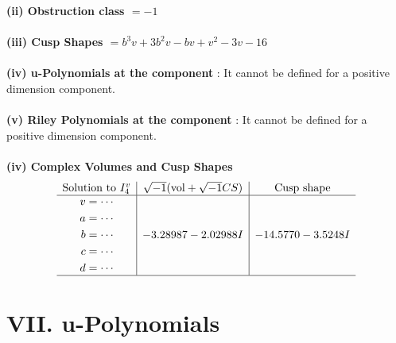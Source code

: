 \documentclass[1p]{elsarticle_modified}
\theoremstyle{definition}
\newcommand{\I}{\sqrt{-1}}
\begin{document}
\flushleft \textbf{(ii) Obstruction class $= -1$}\\~\\
\flushleft \textbf{(iii) Cusp Shapes $= b^3 v+3 b^2 v- b v+v^2-3 v-16$}\\~\\
\flushleft \textbf{(iv) u-Polynomials at the component} : It cannot be defined for a positive dimension component.\\~\\
\flushleft \textbf{(v) Riley Polynomials at the component} : It cannot be defined for a positive dimension component.\\~\\
\newpage\flushleft \textbf{(iv) Complex Volumes and Cusp Shapes}
$$\begin{array}{c|c|c} 
\text{Solution to }I^v_{4}& \I (\text{vol} + \sqrt{-1}CS) & \text{Cusp shape}\\
 \hline 
\begin{aligned}
v &= \cdots \\
a &= \cdots \\
b &= \cdots \\
c &= \cdots \\
d &= \cdots\end{aligned}
 & -3.28987 - 2.02988 I & -14.5770 - 3.5248 I\\
 \hline 
 \end{array}
$$
\newpage\renewcommand{\arraystretch}{1}
\centering \section*{ VII. u-Polynomials}
\end{document}
